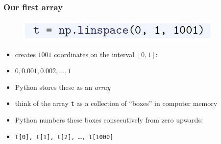 \documentclass[14pt]{beamer}
\newcommand\red[1]{{\color{red} #1}}
\begin{document}
\begin{frame}[fragile]
\frametitle{Our first array}

\begin{figure}[ht]
	\centering
	\includegraphics[width=0.9\textwidth]{figures/LLp20b}
\end{figure}
\vspace*{-8mm}
\begin{itemize}
\item creates $1001$ coordinates on the interval $[0,1]$:
\item[] $0, 0.001, 0.002, \ldots, 1$
\item Python stores these as an \red{\emph{array}}
\item think of the array \texttt{t} as a collection of ``boxes'' in computer memory
\item Python numbers these boxes consecutively from zero upwards:
\item[] \texttt{t[0], t[1], t[2], \ldots, t[1000]}
\end{itemize}


\end{frame}

\end{document}
